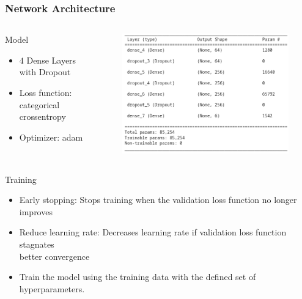 \begin{frame}
    \frametitle{Network Architecture}
    
    \begin{columns}[T]
        \begin{column}{0.4\textwidth}
            \begin{alertblock}{Model}
                \begin{itemize}
                    \item $\num{4}$ Dense Layers with Dropout
                    \item Loss function: categorical crossentropy
                    \item Optimizer: adam
                \end{itemize}    
            \end{alertblock}
        \end{column}
        \begin{column}{0.6\textwidth}
            \begin{figure}
                \hspace*{-1.7cm}
                \includegraphics[width=1\textwidth]{../figures/model_summary.png}
            \end{figure}
        \end{column}
    \end{columns}

    \begin{alertblock}{Training}
        \begin{itemize}
            \item Early stopping: Stops training when the validation loss function no longer improves
            \item Reduce learning rate: Decreases learning rate if validation loss function stagnates \\
            \to better convergence
            \item Train the model using the training data with the defined set of hyperparameters.
        \end{itemize}  
    \end{alertblock}
    
\end{frame}
    